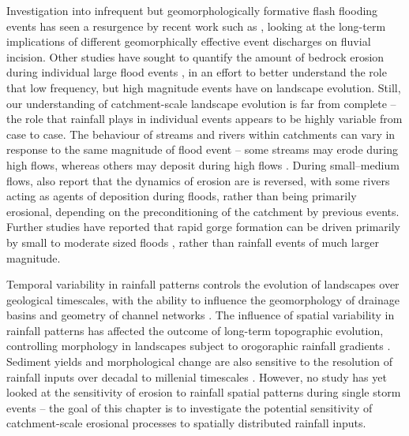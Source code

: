 Investigation into infrequent but geomorphologically formative flash flooding events has seen a resurgence by recent work such as \citet{Huang2006}, looking at the long-term implications of different geomorphically effective event discharges on fluvial incision. Other studies have sought to quantify the amount of bedrock erosion during individual large flood events \citep[e.g.][]{gupta2007catastrophic,lamb2010rapid,baynes2015erosion}, in an effort to better understand the role that low frequency, but high magnitude events have on landscape evolution. Still, our understanding of catchment-scale landscape evolution is far from complete -- the role that rainfall plays in individual events appears to be highly variable from case to case. The behaviour of streams and rivers within catchments can vary in response to the same magnitude of flood event -- some streams may erode during high flows, whereas others may deposit during high flows \citep{turowski2013large}. During small--medium flows, \citet{turowski2013large} also report that the dynamics of erosion are is reversed, with some rivers acting as agents of deposition during floods, rather than being primarily erosional, depending on the preconditioning of the catchment by previous events. Further studies have reported that rapid gorge formation can be driven primarily by small to moderate sized floods \citep{anton2015exceptional}, rather than rainfall events of much larger magnitude.

Temporal variability in rainfall patterns controls the evolution of landscapes over geological timescales, with the ability to influence the geomorphology of drainage basins and geometry of channel networks \citep{Tucker2000,Solyom2004}. The influence of spatial variability in rainfall patterns has affected the outcome of long-term topographic evolution, controlling morphology in landscapes subject to orogoraphic rainfall gradients \citep{solyom2007importance,han2014modeling,han2015measuring}. Sediment yields and morphological change are also sensitive to the resolution of rainfall inputs over decadal to millenial timescales \citep{coulthard2016sensitivity}. However, no study has yet looked at the sensitivity of erosion to rainfall spatial patterns during single storm events -- the goal of this chapter is to investigate the potential sensitivity of catchment-scale erosional processes to spatially distributed rainfall inputs.

%

